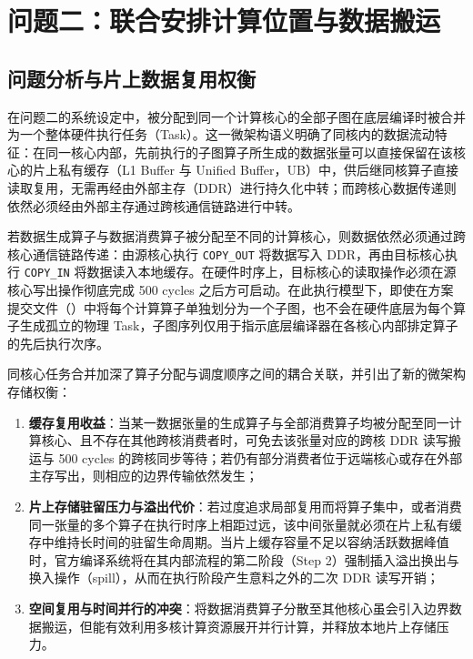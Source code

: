 \documentclass[anonymous,withtoc]{gmcm2026}
\providecommand{\tightlist}{\setlength{\itemsep}{0pt}\setlength{\parskip}{0pt}}
\begin{document}
\section{问题二：联合安排计算位置与数据搬运}

\subsection{问题分析与片上数据复用权衡}

在问题二的系统设定中，被分配到同一个计算核心的全部子图在底层编译时被合并为一个整体硬件执行任务（Task）。这一微架构语义明确了同核内的数据流动特征：在同一核心内部，先前执行的子图算子所生成的数据张量可以直接保留在该核心的片上私有缓存（L1 Buffer 与 Unified Buffer，UB）中，供后继同核算子直接读取复用，无需再经由外部主存（DDR）进行持久化中转；而跨核心数据传递则依然必须经由外部主存通过跨核通信链路进行中转。

若数据生成算子与数据消费算子被分配至不同的计算核心，则数据依然必须通过跨核心通信链路传递：由源核心执行 \texttt{COPY\_OUT} 将数据写入 DDR，再由目标核心执行 \texttt{COPY\_IN} 将数据读入本地缓存。在硬件时序上，目标核心的读取操作必须在源核心写出操作彻底完成 500 cycles 之后方可启动。在此执行模型下，即使在方案提交文件（\texttt{}）中将每个计算算子单独划分为一个子图，也不会在硬件底层为每个算子生成孤立的物理 Task，子图序列仅用于指示底层编译器在各核心内部排定算子的先后执行次序。

同核心任务合并加深了算子分配与调度顺序之间的耦合关联，并引出了新的微架构存储权衡：

\begin{enumerate}
\def\labelenumi{\arabic{enumi}.}
\tightlist
\item
  \textbf{缓存复用收益}：当某一数据张量的生成算子与全部消费算子均被分配至同一计算核心、且不存在其他跨核消费者时，可免去该张量对应的跨核 DDR 读写搬运与 500 cycles 的跨核同步等待；若仍有部分消费者位于远端核心或存在外部主存写出，则相应的边界传输依然发生；
\item
  \textbf{片上存储驻留压力与溢出代价}：若过度追求局部复用而将算子集中，或者消费同一张量的多个算子在执行时序上相距过远，该中间张量就必须在片上私有缓存中维持长时间的驻留生命周期。当片上缓存容量不足以容纳活跃数据峰值时，官方编译系统将在其内部流程的第二阶段（Step 2）强制插入溢出换出与换入操作（spill），从而在执行阶段产生意料之外的二次 DDR 读写开销；
\item
  \textbf{空间复用与时间并行的冲突}：将数据消费算子分散至其他核心虽会引入边界数据搬运，但能有效利用多核计算资源展开并行计算，并释放本地片上存储压力。
\end{enumerate}
\end{document}
